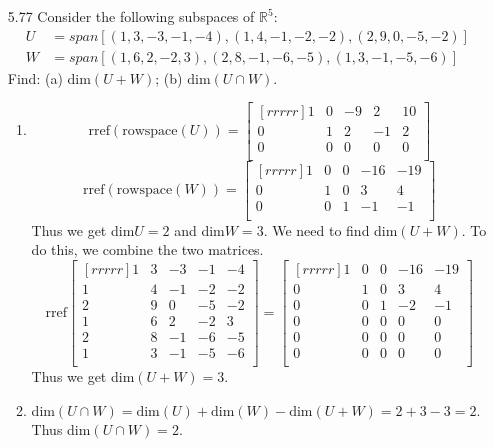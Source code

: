 \documentclass[12pt]{article}
\begin{document}
\begin{enumerate}
\item[5.77] Consider the following subspaces of $\mathbb{R}^5$:
	\begin{align*}
		U &= span[(1,3,-3,-1,-4),(1,4,-1,-2,-2),(2,9,0,-5,-2)]\\
		W &= span[(1,6,2,-2,3),(2,8,-1,-6,-5),(1,3,-1,-5,-6)]
	\end{align*}
	Find: (a) $\mathrm{dim}(U+W)$; (b) $\mathrm{dim}(U\cap W)$.
	\begin{enumerate}
	\item 
	\[ \mathrm{rref}(\mathrm{rowspace}(U)) = \begin{bmatrix}[rrrrr]1&0&-9&2&10\\0&1&2&-1&2\\0&0&0&0&0\\\end{bmatrix} \]
	\[ \mathrm{rref}(\mathrm{rowspace}(W)) = \begin{bmatrix}[rrrrr]1&0&0&-16&-19\\0&1&0&3&4\\0&0&1&-1&-1\\\end{bmatrix} \]
	Thus we get dim$U = 2$ and dim$W=3$. We need to find dim$(U+W)$. To do this, we combine the two matrices.
	\[ \mathrm{rref}\begin{bmatrix}[rrrrr]1&3&-3&-1&-4\\1&4&-1&-2&-2\\2&9&0&-5&-2\\1&6&2&-2&3\\2&8&-1&-6&-5\\1&3&-1&-5&-6\\\end{bmatrix} = \begin{bmatrix}[rrrrr]1&0&0&-16&-19\\0&1&0&3&4\\0&0&1&-2&-1\\0&0&0&0&0\\0&0&0&0&0\\0&0&0&0&0\\\end{bmatrix} \]
	Thus we get dim$(U+W)=3$.
	\item dim$(U\cap W) = \mathrm{dim}(U)+\mathrm{dim}(W)-\mathrm{dim}(U+W) = 2+3-3=2$.\\
	Thus dim$(U\cap W) = 2$.
	\end{enumerate}


\end{enumerate}
\end{document}
